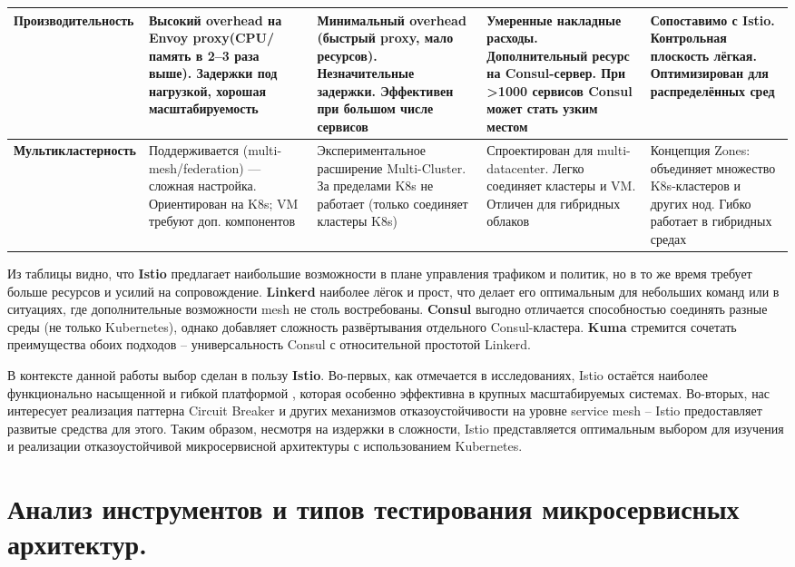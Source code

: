 \begin{longtable}{|p{2.6cm}|p{3.3cm}|p{3.3cm}|p{3.3cm}|p{3.3cm}|}
\textbf{Произво\-ди\-тель\-ность} & 
Высокий overhead на Envoy proxy(CPU/память в 2–3 раза выше). Задержки под нагрузкой\cite{bremler2024performance}, хорошая масштабируемость & 
Минимальный overhead (быстрый proxy, мало ресурсов). Незначительные задержки. Эффективен при большом числе сервисов & 
Умеренные накладные расходы. Дополнительный ресурс на Consul-сервер. При >1000 сервисов Consul может стать узким местом & 
Сопоставимо с Istio. Контрольная плоскость лёгкая. Оптимизирован для распределённых сред \\
\hline

\textbf{Мульти\-клас\-тер\-ность
} & 
Поддерживается (multi-mesh/federation) — сложная настройка. Ориентирован на K8s; VM требуют доп. компонентов & 
Экспериментальное расширение Multi-Cluster. За пределами K8s не работает (только соединяет кластеры K8s) & 
Спроектирован для multi-datacenter. Легко соединяет кластеры и VM. Отличен для гибридных облаков & 
Концепция Zones: объединяет множество K8s-кластеров и других нод. Гибко работает в гибридных средах \\
\hline
\end{longtable}
\endgroup

Из таблицы видно, что \textbf{Istio} предлагает наибольшие возможности в плане управления трафиком и политик, но в то же время требует больше ресурсов и усилий на сопровождение. \textbf{Linkerd} наиболее лёгок и прост, что делает его оптимальным для небольших команд или в ситуациях, где дополнительные возможности mesh не столь востребованы. \textbf{Consul} выгодно отличается способностью соединять разные среды (не только Kubernetes), однако добавляет сложность развёртывания отдельного Consul-кластера. \textbf{Kuma} стремится сочетать преимущества обоих подходов – универсальность Consul с относительной простотой Linkerd.

В контексте данной работы выбор сделан в пользу \textbf{Istio}. Во-первых, как отмечается в исследованиях, Istio остаётся наиболее функционально насыщенной и гибкой платформой \cite{palavesam2025}, которая особенно эффективна в крупных масштабируемых системах. Во-вторых, нас интересует реализация паттерна Circuit Breaker и других механизмов отказоустойчивости на уровне service mesh – Istio предоставляет развитые средства для этого. Таким образом, несмотря на издержки в сложности, Istio представляется оптимальным выбором для изучения и реализации отказоустойчивой микросервисной архитектуры с использованием Kubernetes.

\section{Анализ инструментов и типов тестирования микросервисных архитектур.}
\label{sec:test-analysis}

